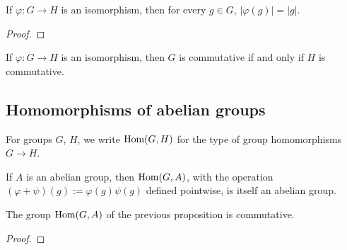 \begin{proposition}
  \label{prop:groups:iso-preserves-order}
  If $\varphi : G \to H$ is an isomorphism, then for every $g \in G$,
  $|\varphi(g)| = |g|$.
\end{proposition}
\begin{proof}
\end{proof}

\begin{proposition}
  \label{prop:groups:iso-preserves-commutativity}
  If $\varphi : G \to H$ is an isomorphism, then $G$ is commutative if
  and only if $H$ is commutative.
\end{proposition}

\subsection{Homomorphisms of abelian groups}
\label{subsec:groups:homomorphisms-of-abelian-groups}

\begin{definition}
  \label{def:groups:group-hom-type}
  \leanok
  For groups $G$, $H$, we write $\operatorname{Hom}(G, H)$ for the type of group
  homomorphisms $G \to H$.
\end{definition}

\begin{proposition}
  \label{prop:groups:hom-abelian-group}
  If $A$ is an abelian group, then $\operatorname{Hom}(G, A)$, with the operation
  $(\varphi + \psi)(g) := \varphi(g) \psi(g)$ defined pointwise, is
  itself an abelian group.
\end{proposition}

\begin{proposition}
  \label{prop:groups:hom-abelian-group-commutative}
  The group $\operatorname{Hom}(G, A)$ of the previous proposition is commutative.
\end{proposition}
\begin{proof}
\end{proof}

